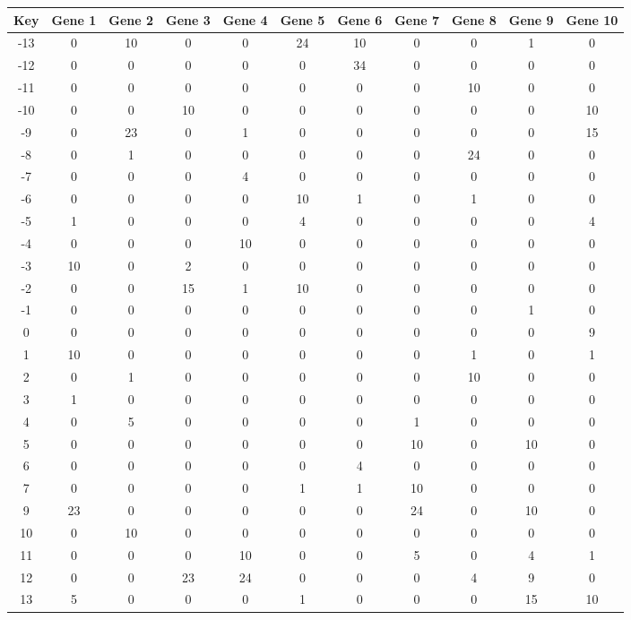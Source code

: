 \begin{tabular}{|c|c|c|c|c|c|c|c|c|c|c|}
\hline
Key & Gene 1 & Gene 2 & Gene 3 & Gene 4 & Gene 5 & Gene 6 & Gene 7 & Gene 8 & Gene 9 & Gene 10 \\
\hline
-13 & 0 & 10 & 0 & 0 & 24 & 10 & 0 & 0 & 1 & 0 \\
-12 & 0 & 0 & 0 & 0 & 0 & 34 & 0 & 0 & 0 & 0 \\
-11 & 0 & 0 & 0 & 0 & 0 & 0 & 0 & 10 & 0 & 0 \\
-10 & 0 & 0 & 10 & 0 & 0 & 0 & 0 & 0 & 0 & 10 \\
-9 & 0 & 23 & 0 & 1 & 0 & 0 & 0 & 0 & 0 & 15 \\
-8 & 0 & 1 & 0 & 0 & 0 & 0 & 0 & 24 & 0 & 0 \\
-7 & 0 & 0 & 0 & 4 & 0 & 0 & 0 & 0 & 0 & 0 \\
-6 & 0 & 0 & 0 & 0 & 10 & 1 & 0 & 1 & 0 & 0 \\
-5 & 1 & 0 & 0 & 0 & 4 & 0 & 0 & 0 & 0 & 4 \\
-4 & 0 & 0 & 0 & 10 & 0 & 0 & 0 & 0 & 0 & 0 \\
-3 & 10 & 0 & 2 & 0 & 0 & 0 & 0 & 0 & 0 & 0 \\
-2 & 0 & 0 & 15 & 1 & 10 & 0 & 0 & 0 & 0 & 0 \\
-1 & 0 & 0 & 0 & 0 & 0 & 0 & 0 & 0 & 1 & 0 \\
0 & 0 & 0 & 0 & 0 & 0 & 0 & 0 & 0 & 0 & 9 \\
1 & 10 & 0 & 0 & 0 & 0 & 0 & 0 & 1 & 0 & 1 \\
2 & 0 & 1 & 0 & 0 & 0 & 0 & 0 & 10 & 0 & 0 \\
3 & 1 & 0 & 0 & 0 & 0 & 0 & 0 & 0 & 0 & 0 \\
4 & 0 & 5 & 0 & 0 & 0 & 0 & 1 & 0 & 0 & 0 \\
5 & 0 & 0 & 0 & 0 & 0 & 0 & 10 & 0 & 10 & 0 \\
6 & 0 & 0 & 0 & 0 & 0 & 4 & 0 & 0 & 0 & 0 \\
7 & 0 & 0 & 0 & 0 & 1 & 1 & 10 & 0 & 0 & 0 \\
9 & 23 & 0 & 0 & 0 & 0 & 0 & 24 & 0 & 10 & 0 \\
10 & 0 & 10 & 0 & 0 & 0 & 0 & 0 & 0 & 0 & 0 \\
11 & 0 & 0 & 0 & 10 & 0 & 0 & 5 & 0 & 4 & 1 \\
12 & 0 & 0 & 23 & 24 & 0 & 0 & 0 & 4 & 9 & 0 \\
13 & 5 & 0 & 0 & 0 & 1 & 0 & 0 & 0 & 15 & 10 \\
\hline
\end{tabular}